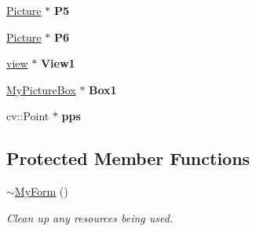 \begin{DoxyCompactItemize}
\mbox{\label{class_glasses_1_1_my_form_a8dbc8d73a0aa294214e1762093fa9409}} 
\hyperlink{class_my_picture_1_1_picture}{Picture} $\ast$ {\bfseries P5}
\item 
\mbox{\label{class_glasses_1_1_my_form_a5aa19ef956718a0bc21a84e1b7e8e740}} 
\hyperlink{class_my_picture_1_1_picture}{Picture} $\ast$ {\bfseries P6}
\item 
\mbox{\label{class_glasses_1_1_my_form_a3c0742af9373c2bd184fc7a65ecb51e5}} 
\hyperlink{class_my_picture_1_1view}{view} $\ast$ {\bfseries View1}
\item 
\mbox{\label{class_glasses_1_1_my_form_ac0b4690ebf57074dfb7d06dd0260ea01}} 
\hyperlink{class_my_picture_1_1_my_picture_box}{My\+Picture\+Box} $\ast$ {\bfseries Box1}
\item 
\mbox{\label{class_glasses_1_1_my_form_a0289b60c6b30663b40d67414c17af134}} 
cv\+::\+Point $\ast$ {\bfseries pps}
\end{DoxyCompactItemize}
\subsection*{Protected Member Functions}
\begin{DoxyCompactItemize}
\item 
\hyperlink{class_glasses_1_1_my_form_ab244dc3aa12a1531b1092f6fc1ad45c3}{$\sim$\+My\+Form} ()
\begin{DoxyCompactList}\small\item\em Clean up any resources being used. \end{DoxyCompactList}\end{DoxyCompactItemize}
